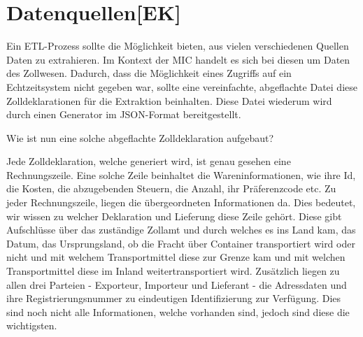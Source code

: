 \newpage
\section{Datenquellen[EK]}
Ein ETL-Prozess sollte die Möglichkeit bieten, aus vielen verschiedenen Quellen Daten zu extrahieren. Im Kontext der MIC handelt es sich bei diesen um Daten des Zollwesen. 
Dadurch, dass die Möglichkeit eines Zugriffs auf ein Echtzeitsystem nicht gegeben war, sollte eine vereinfachte, abgeflachte Datei diese Zolldeklarationen für die Extraktion beinhalten. Diese Datei wiederum wird durch einen Generator im JSON-Format bereitgestellt.
\vspace{5mm}\par
Wie ist nun eine solche abgeflachte Zolldeklaration aufgebaut?
\vspace{5mm}\par
Jede Zolldeklaration, welche generiert wird, ist genau gesehen eine Rechnungszeile. Eine solche Zeile beinhaltet die Wareninformationen, wie ihre Id, die Kosten, die abzugebenden Steuern, die Anzahl, ihr Präferenzcode etc. Zu jeder Rechnungszeile, liegen die übergeordneten Informationen da. Dies bedeutet, wir wissen zu welcher Deklaration und Lieferung diese Zeile gehört. 
Diese gibt Aufschlüsse über das zuständige Zollamt und durch welches es ins Land kam, das Datum, das Ursprungsland, ob die Fracht über Container transportiert wird oder nicht und mit welchem Transportmittel diese zur Grenze kam und mit welchen Transportmittel diese im Inland weitertransportiert wird. Zusätzlich liegen zu allen drei Parteien - Exporteur, Importeur und Lieferant - die Adressdaten und ihre Registrierungsnummer zu eindeutigen Identifizierung zur Verfügung. Dies sind noch nicht alle Informationen, welche vorhanden sind, jedoch sind diese die wichtigsten.
